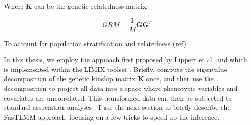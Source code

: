 Where $\mathbf{K}$ can be the genetic relatedness matrix:

\begin{equation}
    GRM = \frac{1}{M}\mathbf{G}\mathbf{G}^T
\end{equation}




To account for population stratification and relatedness (ref)







In this thesis, we employ the approach first proposed by Lippert et al. \cite{lippert2014limix} and which is implemented within the LIMIX toolset \cite{lippert2014limix,casale2015efficient}. 
Briefly, \cite{lippert2014limix} compute the eigenvalue decomposition of the genetic kinship matrix $\mathbf{K}$ once, and then use the decomposition to project all data into a space where phenotypic variables and covariates are uncorrelated. 
This transformed data can then be subjected to standard association analyses \cite{lippert2014limix}.
I use the next section to briefly describe the FasTLMM approach, focusing on a few tricks to speed up the inference.

